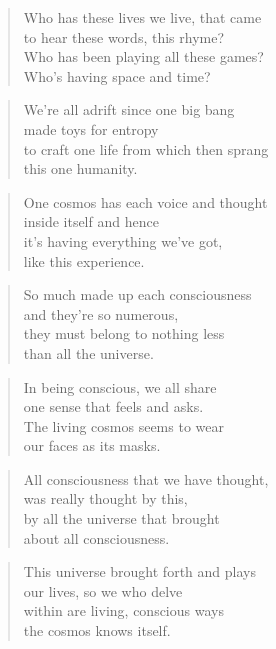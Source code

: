 \documentclass[10pt,a4paper]{article}
\begin{document}
\begin{multicols}{2}
\begin{verse}
Who has these lives we live, that came\\
to hear these words, this rhyme?\\
Who has been playing all these games?\\
Who’s having space and time?
\end{verse}

\begin{verse}
We’re all adrift since one big bang\\
made toys for entropy\\
to craft one life from which then sprang\\
this one humanity.
\end{verse}

\begin{verse}
One cosmos has each voice and thought\\
inside itself and hence\\
it’s having everything we’ve got,\\
like this experience.
\end{verse}

\begin{verse}
So much made up each consciousness\\
and they’re so numerous,\\
they must belong to nothing less\\
than all the universe.
\end{verse}

\begin{verse}
In being conscious, we all share\\
one sense that feels and asks.\\
The living cosmos seems to wear\\
our faces as its masks.
\end{verse}

\begin{verse}
All consciousness that we have thought,\\
was really thought by this,\\
by all the universe that brought\\
about all consciousness.
\end{verse}

\begin{verse}
This universe brought forth and plays\\
our lives, so we who delve\\
within are living, conscious ways\\
the cosmos knows itself.
\end{verse}


\end{multicols}
\end{document}
